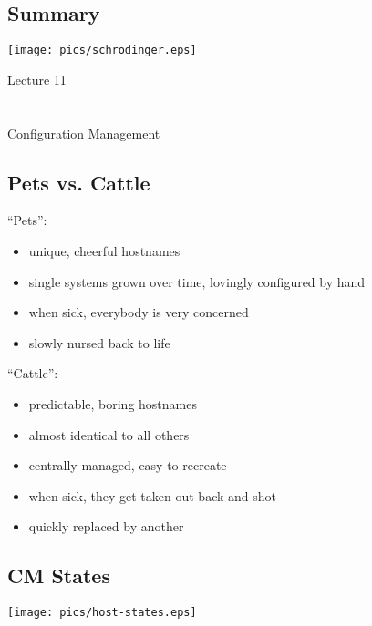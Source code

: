 \documentclass[xga]{xdvislides}
\begin{document}
\subsection{Summary}
\vspace*{\fill}
\begin{center}
	\texttt{[image: pics/schrodinger.eps]}
\end{center}
\vspace*{\fill}



\newpage
\vspace*{\fill}
\begin{center}
    \Hugesize
        Lecture 11 \\ [1em]
    \hspace*{5mm}
    \blueline\\
    \hspace*{5mm}\\
	Configuration Management
\end{center}
\vspace*{\fill}

\subsection{Pets vs. Cattle}
``Pets'':
\begin{itemize}
	\item unique, cheerful hostnames
	\item single systems grown over time, lovingly configured by hand
	\item when sick, everybody is very concerned
	\item slowly nursed back to life
\end{itemize}
\vspace{.25in}
``Cattle'':
\begin{itemize}
	\item predictable, boring hostnames
	\item almost identical to all others
	\item centrally managed, easy to recreate
	\item when sick, they get taken out back and shot
	\item quickly replaced by another
\end{itemize}

\subsection{CM States}
\vspace*{\fill}
\begin{center}
	\texttt{[image: pics/host-states.eps]} \\
\end{center}
\vspace*{\fill}
\end{document}
